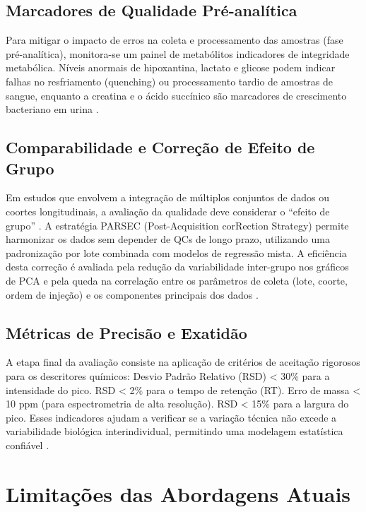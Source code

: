 \subsection{Marcadores de Qualidade Pré-analítica}

Para mitigar o impacto de erros na coleta e processamento das amostras (fase pré-analítica), monitora-se um painel de metabólitos indicadores de integridade metabólica. Níveis anormais de hipoxantina, lactato e glicose podem indicar falhas no resfriamento (quenching) ou processamento tardio de amostras de sangue, enquanto a creatina e o ácido succínico são marcadores de crescimento bacteriano em urina \cite{doi:10.1021/acs.analchem.3c03660}.

\subsection{Comparabilidade e Correção de Efeito de Grupo}

Em estudos que envolvem a integração de múltiplos conjuntos de dados ou coortes longitudinais, a avaliação da qualidade deve considerar o ``efeito de grupo'' \cite{SALANON2025344753}. A estratégia PARSEC (Post-Acquisition corRection Strategy) permite harmonizar os dados sem depender de QCs de longo prazo, utilizando uma padronização por lote combinada com modelos de regressão mista. A eficiência desta correção é avaliada pela redução da variabilidade inter-grupo nos gráficos de PCA e pela queda na correlação entre os parâmetros de coleta (lote, coorte, ordem de injeção) e os componentes principais dos dados \cite{SALANON2025344753}.

\subsection{Métricas de Precisão e Exatidão}

A etapa final da avaliação consiste na aplicação de critérios de aceitação rigorosos para os descritores químicos:
Desvio Padrão Relativo (RSD) < 30\% para a intensidade do pico.
RSD < 2\% para o tempo de retenção (RT).
Erro de massa < 10 ppm (para espectrometria de alta resolução).
RSD < 15\% para a largura do pico.
Esses indicadores ajudam a verificar se a variação técnica não excede a variabilidade biológica interindividual, permitindo uma modelagem estatística confiável \cite{doi:10.1021/acs.analchem.3c03660, SALANON2025344753}. 

\section{\textbf{Limitações das Abordagens Atuais}}

